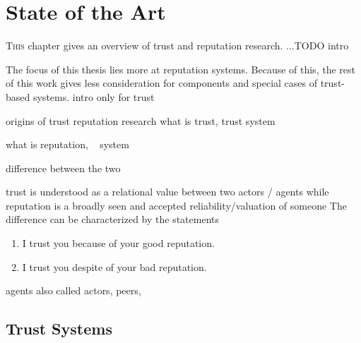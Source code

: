 \documentclass[%
    ]{\PathToTumTemplate/thesis/tum_thesis}
\begin{document}
\chapter{State of the Art}\label{chap:sota}


\lettrine{T}{his} chapter gives an overview of trust and reputation research.
...TODO intro

The focus of this thesis lies more at reputation systems.
Because of this, the rest of this work gives less consideration for components and special cases of trust-based systems.
intro only for trust

origins of trust reputation research
what is trust, trust system

what is reputation, ~ system

difference between the two

trust is understood as a relational value between two actors / agents
while reputation is a broadly seen and accepted reliability/valuation of someone
The difference can be characterized by the statements

\begin{enumerate}
	\item I trust you because of your good reputation.
	\item I trust you despite of your bad reputation.
\end{enumerate}

agents also called actors, peers, 

\section{Trust Systems}
\end{document}
